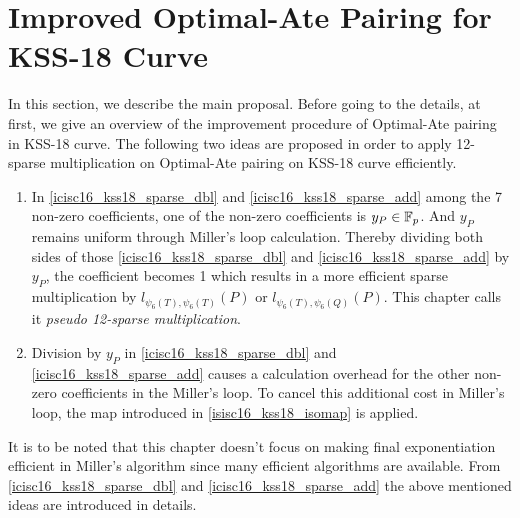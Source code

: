 \section{Improved Optimal-Ate Pairing for KSS-18 Curve} 
In this section, we describe the main proposal. Before going to the details, at first, we give an overview of the improvement procedure of Optimal-Ate pairing in KSS-18 curve. The following two ideas are proposed in order to apply 12-sparse multiplication on Optimal-Ate pairing on KSS-18 curve efficiently. 
\begin{enumerate}
	\item In \eqref{icisc16_kss18_sparse_dbl} and \eqref{icisc16_kss18_sparse_add} among the 7 non-zero coefficients, one of the non-zero coefficients is $y_P \in {\mathbb{F}}_{p}$. And $y_P$ remains uniform through Miller's loop calculation. Thereby dividing both sides of those \eqref{icisc16_kss18_sparse_dbl} and \eqref{icisc16_kss18_sparse_add} by $y_P$, the coefficient becomes 1 which results in a more efficient sparse multiplication by $l_{\psi_6(T),\psi_6(T)}(P)$ or $l_{\psi_6(T),\psi_6(Q)}(P)$. This chapter calls it \textit{pseudo 12-sparse multiplication}.
	\item Division by $y_P$ in \eqref{icisc16_kss18_sparse_dbl} and \eqref{icisc16_kss18_sparse_add} causes a calculation overhead for the other non-zero coefficients in the Miller's loop. To cancel this  additional cost in Miller's loop, the map introduced in \eqref{isisc16_kss18_isomap} is applied.
\end{enumerate}
It is to be noted that this chapter doesn't focus on making final exponentiation efficient in Miller's algorithm since many efficient algorithms are available.
From \eqref{icisc16_kss18_sparse_dbl} and \eqref{icisc16_kss18_sparse_add} the above mentioned ideas are introduced in details.
